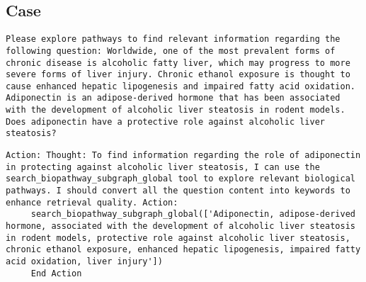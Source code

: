 
\subsection{\modelname Case} \label{appendix agent case}

\begin{lstlisting}[style=QuestionType]
Please explore pathways to find relevant information regarding the following question: Worldwide, one of the most prevalent forms of chronic disease is alcoholic fatty liver, which may progress to more severe forms of liver injury. Chronic ethanol exposure is thought to cause enhanced hepatic lipogenesis and impaired fatty acid oxidation. Adiponectin is an adipose-derived hormone that has been associated with the development of alcoholic liver steatosis in rodent models. Does adiponectin have a protective role against alcoholic liver steatosis?
\end{lstlisting}
\begin{lstlisting}[style=AnswerType]
Action: Thought: To find information regarding the role of adiponectin in protecting against alcoholic liver steatosis, I can use the search_biopathway_subgraph_global tool to explore relevant biological pathways. I should convert all the question content into keywords to enhance retrieval quality. Action:
     search_biopathway_subgraph_global(['Adiponectin, adipose-derived hormone, associated with the development of alcoholic liver steatosis in rodent models, protective role against alcoholic liver steatosis, chronic ethanol exposure, enhanced hepatic lipogenesis, impaired fatty acid oxidation, liver injury'])
     End Action
\end{lstlisting}
